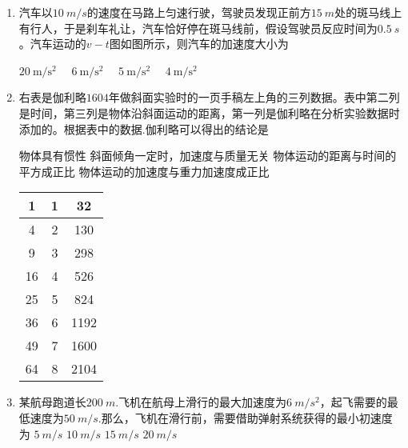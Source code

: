 \begin{enumerate}
\item 
{}
汽车以$ 10 \ m/s $的速度在马路上匀速行驶，驾驶员发现正前方$ 15 \ m $处的斑马线上有行人，于是刹车礼让，汽车恰好停在斑马线前，假设驾驶员反应时间为$ 0.5 \ s $。汽车运动的$ v-t $图如图所示，则汽车的加速度大小为  
\begin{figure}[h!]
\centering

\end{figure}


\fourchoices
{$20\ \mathrm { m }/ \mathrm { s } ^ { 2 } \quad$}
{$6\ \mathrm { m } / \mathrm { s } ^ { 2 } \quad$}
{$5\ \mathrm { m } / \mathrm { s } ^ { 2 } \quad$}
{$4\ \mathrm { m } / \mathrm { s } ^ { 2 }$}



\item 
{}
右表是伽利略$ 1604 $年做斜面实验时的一页手稿左上角的三列数据。表中第二列是时间，第三列是物体沿斜面运动的距离，第一列是伽利略在分析实验数据时添加的。根据表中的数据.伽利略可以得出的结论是  



\begin{minipage}[h!]{0.7\linewidth}
\vspace{0.3em}
\fourchoices
{物体具有惯性}
{斜面倾角一定时，加速度与质量无关}
{物体运动的距离与时间的平方成正比}
{物体运动的加速度与重力加速度成正比}

\vspace{0.3em}
\end{minipage}
\hfill
\begin{minipage}[h!]{0.3\linewidth}
\flushright
\vspace{0.3em}
\centering 
\begin{tabular}{|c|c|c|}
\hline 
1 & 1 & 32
 \\
\hline
4 & 2 & 130
 \\
\hline
9 & 3 & 298
 \\
\hline
16 & 4 & 526
 \\
\hline
25 & 5 & 824
 \\
\hline
36 & 6 & 1192
 \\
\hline
49 & 7 & 1600
 \\
\hline
64 & 8 & 2104
 \\
\hline
\end{tabular}
\vspace{0.3em}
\end{minipage}



\item 
{}
某航母跑道长$ 200 \ m $.飞机在航母上滑行的最大加速度为$ 6 \ m/s ^{2} $，起飞需要的最低速度为$ 50 \ m/s $.那么，飞机在滑行前，需要借助弹射系统获得的最小初速度为
\fourchoices
{$ 5 \ m/s $}
{$ 10 \ m/s $}
{$ 15 \ m/s $}
{$ 20 \ m/s $}


\end{enumerate}
